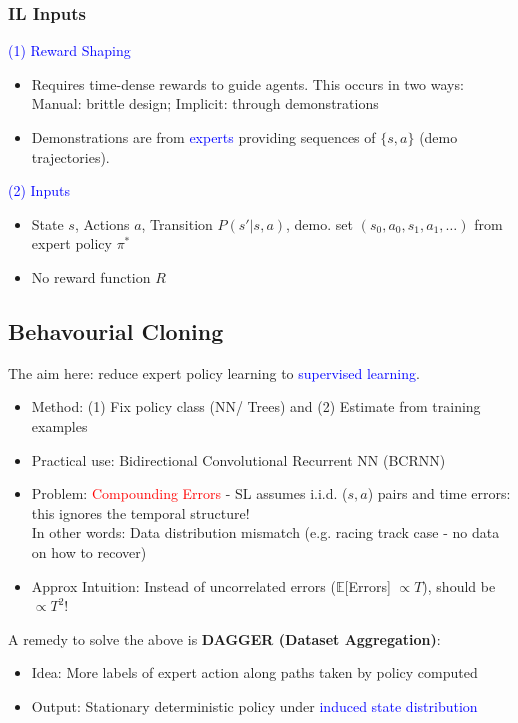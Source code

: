\documentclass{article}
\begin{document}
\begin{defbox}
    \subsubsection*{IL Inputs}
    \textcolor{blue}{(1) Reward Shaping}
    \begin{itemize}
    \item Requires time-dense rewards to guide agents. This occurs in two ways:
        \\Manual: brittle design; Implicit: through demonstrations
    \item Demonstrations are from \textcolor{blue}{experts} providing sequences of $\{s, a\}$ (demo trajectories).
    \end{itemize}

    \textcolor{blue}{(2) Inputs}
    \begin{itemize}
    \item State $s$, Actions $a$, Transition $P(s' | s, a)$, demo. set $(s_0, a_0, s_1, a_1, \dots)$ from expert policy $\pi^{*}$
    \item No reward function $R$ 
    \end{itemize}
\end{defbox}

\subsection{Behavourial Cloning}
The aim here: reduce expert policy learning to \textcolor{blue}{supervised learning}.
\begin{itemize}
\item Method: (1) Fix policy class (NN/ Trees) and (2) Estimate from training examples
\item Practical use: Bidirectional Convolutional Recurrent NN (BCRNN)
\item Problem: \textcolor{red}{Compounding Errors} - SL assumes i.i.d. ($s, a$) pairs and time errors: this ignores the temporal structure!
    \\In other words: Data distribution mismatch (e.g. racing track case - no data on how to recover)
\item Approx Intuition: Instead of uncorrelated errors ($\mathbb{E}$[Errors] $\propto T$), should be $\propto T^2$!
\end{itemize}

A remedy to solve the above is \textbf{DAGGER (Dataset Aggregation)}:
\begin{itemize}
\item Idea: More labels of expert action along paths taken by policy computed
\item Output: Stationary deterministic policy under \textcolor{blue}{induced state distribution} 
\end{itemize}
\end{document}
